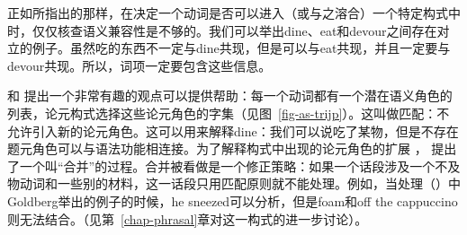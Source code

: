 正如\citet[--90]{Dowty89b-u}所指出的那样，在决定一个动词是否可以进入（或与之溶合）一个特定构式中时，仅仅核查语义兼容性是不够的。我们可以举出dine、eat和devour之间存在对立的例子。虽然吃的东西不一定与dine共现，但是可以与eat共现，并且一定要与devour共现。所以，词项一定要包含这些信息。

和\citet{SvT2011a} 提出一个非常有趣的观点可以提供帮助：每一个动词都有一个潜在语义角色的列表，论元构式选择这些论元角色的字集（见图~\ref{fig-as-trijp}）。这叫做匹配：不允许引入新的论元角色。这可以用来解释dine：我们可以说吃了某物，但是不存在题元角色可以与语法功能相连接。为了解释构式中出现的论元角色的扩展 \citep[\S~7]{Goldberg95a}，\citet{SvT2011a} 提出了一个叫“合并”的过程。合并被看做是一个修正策略：如果一个话段涉及一个不及物动词和一些别的材料，这一话段只用匹配原则就不能处理。例如，当处理（）中Goldberg举出的例子的时候，he sneezed可以分析，但是foam和off the cappuccino则无法结合。（见第~\ref{chap-phrasal}章对这一构式的进一步讨论）。
